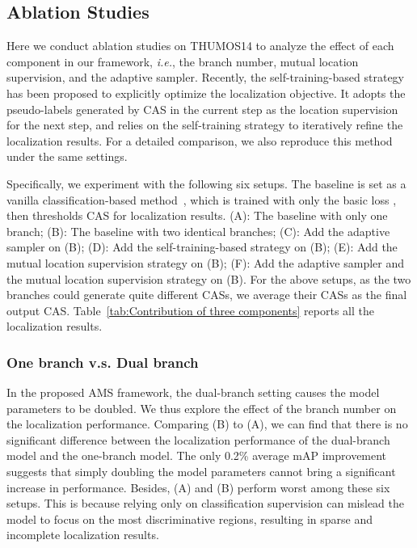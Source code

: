 \documentclass[journal]{IEEEtran}
\begin{document}
\subsection{Ablation Studies}
Here we conduct ablation studies on THUMOS14 to analyze the effect of each component in our framework, \emph{i.e.}, the branch number, mutual location supervision, and the adaptive sampler. Recently, the self-training-based strategy~\cite{pardo2021refineloc,luo2020weakly,zhai2020two} has been proposed to explicitly optimize the localization objective. It adopts the pseudo-labels generated by CAS in the current step as the location supervision for the next step, and relies on the self-training strategy to iteratively refine the localization results. For a detailed comparison, we also reproduce this method under the same settings.

Specifically, we experiment with the following six setups. The baseline is set as a vanilla classification-based method~\cite{nguyen2018weakly,paul2018w}, which is trained with only the basic loss , then thresholds CAS for localization results. 
(A): The baseline with only one branch;
(B): The baseline with two identical branches;
(C): Add the adaptive sampler on (B);
(D): Add the self-training-based strategy on (B);
(E): Add the mutual location supervision strategy on (B);
(F): Add the adaptive sampler and the mutual location supervision strategy on (B).
For the above setups, as the two branches could generate quite different CASs, we average their CASs as the final output CAS. Table~\ref{tab:Contribution of three components} reports all the localization results.



\subsubsection{One branch v.s. Dual branch}
In the proposed AMS framework, the dual-branch setting causes the model parameters to be doubled. We thus explore the effect of the branch number on the localization performance. Comparing (B) to (A), we can find that there is no significant difference between the localization performance of the dual-branch model and the one-branch model. The only 0.2\% average mAP improvement suggests that simply doubling the model parameters cannot bring a significant increase in performance. Besides, (A) and (B) perform worst among these six setups. This is because relying only on classification supervision can mislead the model to focus on the most discriminative regions, resulting in sparse and incomplete localization results.
\end{document}
